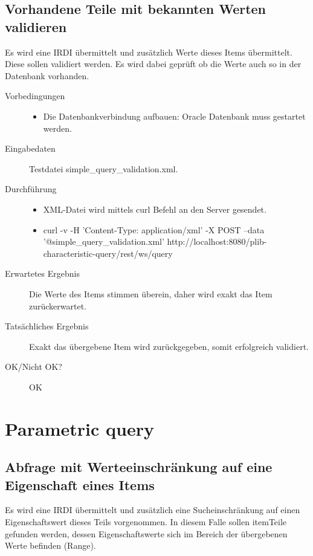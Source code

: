 \subsection{Vorhandene Teile mit bekannten Werten validieren}

Es wird eine IRDI übermittelt und zusätzlich Werte dieses Items übermittelt. Diese sollen validiert werden. Es wird dabei geprüft ob die Werte auch so in der Datenbank vorhanden. 

\begin{description}
\item[Vorbedingungen] 
  \begin{itemize}
   \item Die Datenbankverbindung aufbauen: Oracle Datenbank muss gestartet werden.
  \end{itemize}
\item[Eingabedaten] Testdatei simple\_query\_validation.xml. 
\item[Durchführung]
   \begin{itemize}
   \item XML-Datei wird mittels curl Befehl an den Server gesendet.
   \item curl -v -H 'Content-Type: application/xml' -X POST --data '@simple\_query\_validation.xml' http://localhost:8080/plib-characteristic-query/rest/ws/query
  \end{itemize}
\item[Erwartetes Ergebnis] Die Werte des Items stimmen überein, daher wird exakt das Item zurückerwartet.  
\item[Tatsächliches Ergebnis] Exakt das übergebene Item wird zurückgegeben, somit erfolgreich validiert. 
\item[OK/Nicht OK?] OK
\end{description}

\section{Parametric query}

\subsection{Abfrage mit Werteeinschränkung auf eine Eigenschaft eines Items}

Es wird eine IRDI übermittelt und zusätzlich eine Sucheinschränkung auf einen Eigenschaftswert dieses Teils vorgenommen. In diesem Falle sollen \gls{item}{Teile} gefunden werden, dessen Eigenschaftswerte sich im Bereich der übergebenen Werte befinden (Range). 

